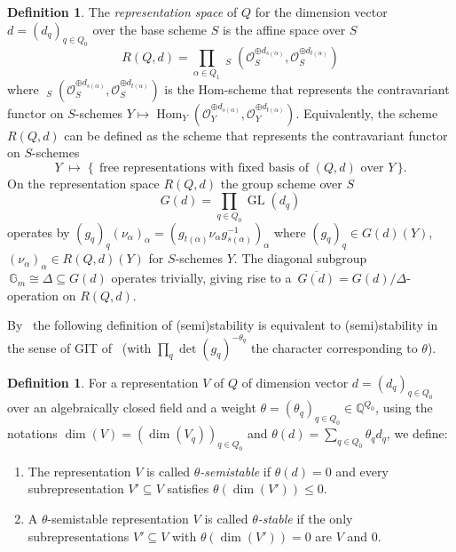 \documentclass[10pt,a4paper]{amsart}
\theoremstyle{definition}
\newtheorem{defi}[theo]{Definition}
\def\Q{\mathds Q}
\def\G{\mathds G}
\def\O{\mathcal O}
\DeclareMathOperator{\Hom}{Hom}
\DeclareMathOperator{\UHom}{\underline{Hom}}
\DeclareMathOperator{\GL}{GL}
\begin{document}
\begin{defi}
The {\it representation space} of $Q$ for the dimension vector $d=(d_q)_{q\in Q_0}$
over the base scheme $S$ is the affine space over $S$
\[
R(Q,d)=\prod_{\alpha\in Q_1}\UHom_S(\O_S^{\oplus d_{s(\alpha)}},
\O_S^{\oplus d_{t(\alpha)}})
\]
where $\UHom_S(\O_S^{\oplus d_{s(\alpha)}},\O_S^{\oplus d_{t(\alpha)}})$ 
is the Hom-scheme that represents the contravariant functor on $S$-schemes
$Y\mapsto\Hom_Y(\O_Y^{\oplus d_{s(\alpha)}},\O_Y^{\oplus d_{t(\alpha)}})$.
Equivalently, the scheme $R(Q,d)$ can be defined as the scheme that represents 
the contravariant functor on $S$-schemes
\[
Y\;\mapsto\;\big\{\;\,\text{free representations with fixed basis of $(Q,d)$ 
over $Y$}\,\big\}.
\]
On the representation space $R(Q,d)$ the group scheme over $S$
\[
G(d)=\prod_{q\in Q_0}\GL(d_q)
\]
operates by $(g_q)_q(\nu_\alpha)_\alpha=(g_{t(\alpha)}\nu_\alpha 
g_{s(\alpha)}^{-1})_\alpha$ where $(g_q)_q\in G(d)(Y)$,
$(\nu_\alpha)_\alpha\in R(Q,d)(Y)$ for $S$-schemes $Y$.
The diagonal subgroup $\,\G_m\cong\Delta\subseteq G(d)$ operates trivially, 
giving rise to a $\,\overline{G(d)}=G(d)/\Delta$-operation on $R(Q,d)$.
\end{defi}

By~\cite{Ki94} the following definition of (semi)stability is equivalent to 
(semi)stability in the sense of GIT of~\cite{MFK} (with $\prod_q\det(g_q)^{-\theta_q}$
the character corresponding to $\theta$).

\begin{defi}
For a representation $V$ of $Q$ of dimension vector $d=(d_q)_{q\in Q_0}$
over an algebraically closed field and a weight 
$\theta=(\theta_q)_{q\in Q_0}\in\Q^{Q_0}$, using the notations
$\dim(V)=(\dim(V_q))_{q\in Q_0}$ and $\theta(d)=\sum_{q\in Q_0}\theta_qd_q$, 
we define: %

\begin{enumerate}[label=(\alph*)]
\item \label{defi1.3_a}
The representation $V$ is called {\it $\theta$-semistable} if
$\theta(d)=0$ and every subrepresentation $V'\subseteq V$ satisfies 
$\theta(\dim(V'))\leq 0$. %

\item \label{defi1.3_b}
A $\theta$-semistable representation $V$ is called {\it $\theta$-stable} if 
the only subrepresentations $V'\subseteq V$ with $\theta(\dim(V'))=0$ are $V$ and $0$.
\end{enumerate}
\end{defi}
\end{document}

